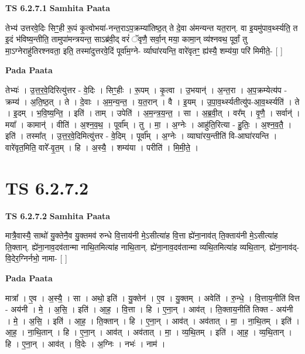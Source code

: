 \documentclass[17pt]{extarticle}
\begin{document}
\textbf{TS 6.2.7.1 } \newline
\textbf{Samhita Paata} \newline

तेभ्य॑ उत्तरवे॒दिः सिꣳ॒॒॒ही रू॒पं कृ॒त्वोभया॑-नन्त॒राऽप॒क्रम्या॑तिष्ठ॒त् ते दे॒वा अ॑मन्यन्त यत॒रान्. वा इ॒यमु॑पाव॒र्थ्स्यति॒ त इ॒दं भ॑विष्य॒न्तीति॒ तामुपा॑मन्त्रयन्त॒ साऽब्र॑वी॒द् वरं॑ ॅवृणै॒ सर्वा॒न् मया॒ कामा॒न् व्य॑श्नवथ॒ पूर्वां॒ तु मा॒ऽग्नेराहु॑तिरश्नवता॒ इति॒ तस्मा॑दुत्तरवे॒दिं पूर्वा॑म॒ग्ने- र्व्याघा॑रयन्ति॒ वारे॑वृतꣳ॒॒ ह्य॑स्यै॒ शम्य॑या॒ परि॑ मिमीते॒- [  ] \newline

\textbf{Pada Paata} \newline

तेभ्यः॑ । उ॒त्त॒र॒वे॒दिरित्यु॑त्तर - वे॒दिः । सिꣳ॒॒हीः । रू॒पम् । कृ॒त्वा । उ॒भयान्॑ । अ॒न्त॒रा । अ॒प॒क्रम्येत्य॑प - क्रम्य॑ । अ॒ति॒ष्ठ॒त् । ते । दे॒वाः । अ॒म॒न्य॒न्त॒ । य॒त॒रान् । वै । इ॒यम् । उ॒पा॒व॒र्थ्स्यतीत्यु॑प-आ॒व॒र्थ्स्यति॑ । ते । इ॒दम् । भ॒वि॒ष्य॒न्ति॒ । इति॑ । ताम् । उपेति॑ । अ॒म॒न्त्र॒य॒न्त॒ । सा । अ॒ब्र॒वी॒त् । वर᳚म् । वृ॒णै॒ । सर्वान्॑ । मया᳚ । कामान्॑ । वीति॑ । अ॒श्न॒व॒थ॒ । पूर्वा᳚म् । तु । मा॒ । अ॒ग्नेः । आहु॑ति॒रित्या - हु॒तिः॒ । अ॒श्न॒व॒तै॒ । इति॑ । तस्मा᳚त् । उ॒त्त॒र॒वे॒दिमित्यु॑त्तर - वे॒दिम् । पूर्वा᳚म् । अ॒ग्नेः । व्याघा॑रय॒न्तीति॑ वि-आघा॑रयन्ति । वारे॑वृत॒मिति॒ वारे᳚-वृ॒त॒म् । हि । अ॒स्यै॒ । शम्य॑या । परीति॑ । मि॒मी॒ते॒ ।  \newline




\section*{ TS 6.2.7.2 }

\textbf{TS 6.2.7.2 } \newline
\textbf{Samhita Paata} \newline

मात्रै॒वास्यै॒ साथो॑ यु॒क्तेनै॒व यु॒क्तमव॑ रुन्धे वि॒त्ताय॑नी मे॒ऽसीत्या॑ह वि॒त्ता ह्ये॑ना॒नाव॑त् ति॒क्ताय॑नी मे॒ऽसीत्या॑ह ति॒क्तान्. ह्ये॑ना॒नाव॒दव॑तान्मा नाथि॒तमित्या॑ह नाथि॒तान्. ह्ये॑ना॒नाव॒दव॑तान्मा व्यथि॒तमित्या॑ह व्यथि॒तान्. ह्ये॑ना॒नाव॑द्-वि॒देर॒ग्निर्नभो॒ नामा- [  ] \newline

\textbf{Pada Paata} \newline

मात्रा᳚ । ए॒व । अ॒स्यै॒ । सा । अथो॒ इति॑ । यु॒क्तेन॑ । ए॒व । यु॒क्तम् । अवेति॑ । रु॒न्धे॒ । वि॒त्ताय॒नीति॑ वित्त - अय॑नी । मे॒ । अ॒सि॒ । इति॑ । आ॒ह॒ । वि॒त्ता । हि । ए॒ना॒न् । आव॑त् । ति॒क्ताय॒नीति॑ तिक्त - अय॑नी । मे॒ । अ॒सि॒ । इति॑ । आ॒ह॒ । ति॒क्तान् । हि । ए॒ना॒न् । आव॑त् । अव॑तात् । मा॒ । ना॒थि॒तम् । इति॑ । आ॒ह॒ । ना॒थि॒तान् । हि । ए॒ना॒न् । आव॑त् । अव॑तात् । मा॒ । व्य॒थि॒तम् । इति॑ । आ॒ह॒ । व्य॒थि॒तान् । हि । ए॒ना॒न् । आव॑त् । वि॒देः । अ॒ग्निः । नभः॑ । नाम॑ ।  \newline
\end{document}

